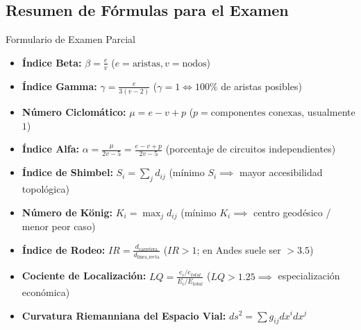 \documentclass[11pt,a4paper]{article}
\begin{document}
\subsection{Resumen de Fórmulas para el Examen}
\begin{formulabox}{Formulario de Examen Parcial}
\begin{itemize}[leftmargin=*]
    \item \textbf{Índice Beta:} $\beta = \frac{e}{v}$ \hfill ($e = \text{aristas}, v = \text{nodos}$)
    \item \textbf{Índice Gamma:} $\gamma = \frac{e}{3(v - 2)}$ \hfill ($\gamma = 1 \iff 100\%$ de aristas posibles)
    \item \textbf{Número Ciclomático:} $\mu = e - v + p$ \hfill ($p = \text{componentes conexas}$, usualmente $1$)
    \item \textbf{Índice Alfa:} $\alpha = \frac{\mu}{2v - 5} = \frac{e - v + p}{2v - 5}$ \hfill (porcentaje de circuitos independientes)
    \item \textbf{Índice de Shimbel:} $S_i = \sum_{j} d_{ij}$ \hfill (mínimo $S_i \implies$ mayor accesibilidad topológica)
    \item \textbf{Número de König:} $K_i = \max_{j} d_{ij}$ \hfill (mínimo $K_i \implies$ centro geodésico / menor peor caso)
    \item \textbf{Índice de Rodeo:} $IR = \frac{d_{\text{carretera}}}{d_{\text{línea\_recta}}}$ \hfill ($IR > 1$; en Andes suele ser $> 3.5$)
    \item \textbf{Cociente de Localización:} $LQ = \frac{e_i / e_{total}}{E_i / E_{total}}$ \hfill ($LQ > 1.25 \implies$ especialización económica)
    \item \textbf{Curvatura Riemanniana del Espacio Vial:} $ds^2 = \sum g_{ij} dx^i dx^j$
\end{itemize}
\end{formulabox}
\end{document}
